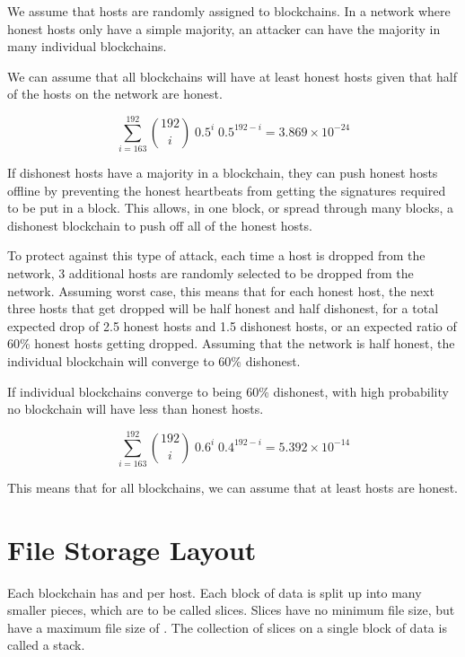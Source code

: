 \documentclass[twocolumn]{article}
\begin{document}
We assume that hosts are randomly assigned to blockchains.
In a network where honest hosts only have a simple majority, an attacker can have the majority in many individual blockchains.

We can assume that all blockchains will have at least \inversemaxcorruption{} honest hosts given that half of the hosts on the network are honest.

\begin{equation}
\sum_{i=163}^{192} {192 \choose i} \; 0.5^{i} \; 0.5^{192-i} = 3.869\times10^{-24}
\end{equation}

If dishonest hosts have a majority in a blockchain, they can push honest hosts offline by preventing the honest heartbeats from getting the signatures required to be put in a block.
This allows, in one block, or spread through many blocks, a dishonest blockchain to push off all of the honest hosts.

To protect against this type of attack, each time a host is dropped from the network, 3 additional hosts are randomly selected to be dropped from the network.
Assuming worst case, this means that for each honest host, the next three hosts that get dropped will be half honest and half dishonest, for a total expected drop of 2.5 honest hosts and 1.5 dishonest hosts, or an expected ratio of 60\% honest hosts getting dropped.
Assuming that the network is half honest, the individual blockchain will converge to 60\% dishonest.

If individual blockchains converge to being 60\% dishonest, with high probability no blockchain will have less than \inversemaxcorruption{} honest hosts.

\begin{equation}
\sum_{i=163}^{192} {192 \choose i} \; 0.6^{i} \; 0.4^{192-i} = 5.392\times10^{-14}
\end{equation}

This means that for all blockchains, we can assume that at least \inversemaxcorruption{} hosts are honest.

\section{File Storage Layout}

Each blockchain has \numhosts{} and \storageperhost{} per host.
Each \storageperhost{} block of data is split up into many smaller pieces, which are to be called slices.
Slices have no minimum file size, but have a maximum file size of \maxslicesize.
The collection of slices on a single block of data is called a stack.
\end{document}
